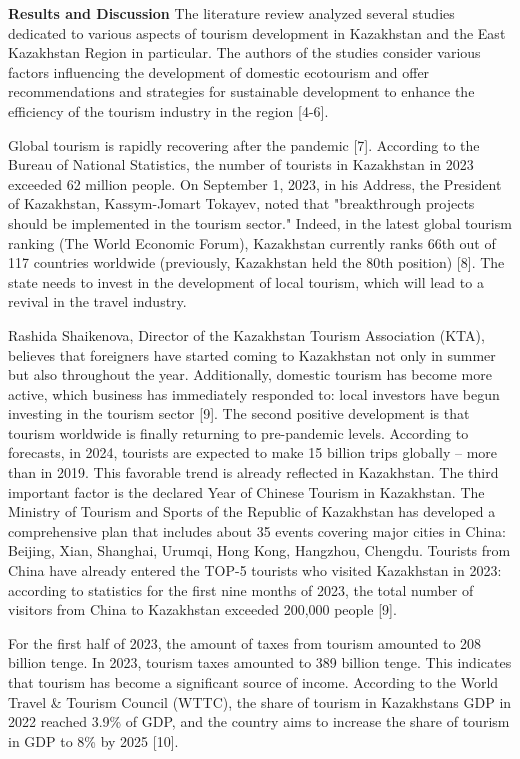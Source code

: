{\bfseries Results and Discussion} The literature review analyzed several
studies dedicated to various aspects of tourism development in
Kazakhstan and the East Kazakhstan Region in particular. The authors of
the studies consider various factors influencing the development of
domestic ecotourism and offer recommendations and strategies for
sustainable development to enhance the efficiency of the tourism
industry in the region {[}4-6{]}.

Global tourism is rapidly recovering after the pandemic {[}7{]}.
According to the Bureau of National Statistics, the number of tourists
in Kazakhstan in 2023 exceeded 62 million people. On September 1, 2023,
in his Address, the President of Kazakhstan, Kassym-Jomart Tokayev,
noted that "breakthrough projects should be implemented in the tourism
sector." Indeed, in the latest global tourism ranking (The World
Economic Forum), Kazakhstan currently ranks 66th out of 117 countries
worldwide (previously, Kazakhstan held the 80th position) {[}8{]}. The
state needs to invest in the development of local tourism, which will
lead to a revival in the travel industry.

Rashida Shaikenova, Director of the Kazakhstan Tourism Association
(KTA), believes that foreigners have started coming to Kazakhstan not
only in summer but also throughout the year. Additionally, domestic
tourism has become more active, which business has immediately responded
to: local investors have begun investing in the tourism sector {[}9{]}.
The second positive development is that tourism worldwide is finally
returning to pre-pandemic levels. According to forecasts, in 2024,
tourists are expected to make 15 billion trips globally -- more than in
2019. This favorable trend is already reflected in Kazakhstan. The third
important factor is the declared Year of Chinese Tourism in Kazakhstan.
The Ministry of Tourism and Sports of the Republic of Kazakhstan has
developed a comprehensive plan that includes about 35 events covering
major cities in China: Beijing, Xi\textquotesingle an, Shanghai, Urumqi,
Hong Kong, Hangzhou, Chengdu. Tourists from China have already entered
the TOP-5 tourists who visited Kazakhstan in 2023: according to
statistics for the first nine months of 2023, the total number of
visitors from China to Kazakhstan exceeded 200,000 people {[}9{]}.

For the first half of 2023, the amount of taxes from tourism amounted to
208 billion tenge. In 2023, tourism taxes amounted to 389 billion tenge.
This indicates that tourism has become a significant source of income.
According to the World Travel \& Tourism Council (WTTC), the share of
tourism in Kazakhstan\textquotesingle s GDP in 2022 reached 3.9\% of
GDP, and the country aims to increase the share of tourism in GDP to 8\%
by 2025 {[}10{]}.

